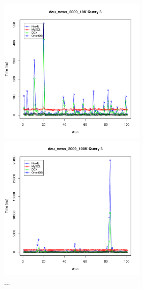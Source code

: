 \documentclass[11pt, a4paper, oneside]{article} %
\begin{document}
\begin{appendix}
\begin{figure}[ht]
\begin{minipage}[hbt]{7cm}
	\centering
	\includegraphics[width=7cm]{../results/cold caches/images/10K_query3_perf}
	\caption{...}
	\label{fig:10k_query3_perf}
\end{minipage}
\hfill
\begin{minipage}[hbt]{7cm}
	\centering
	\includegraphics[width=7cm]{../results/cold caches/images/100K_query3_perf}
	\caption{...}
	\label{fig:100k_query3_perf}
\end{minipage}
\end{figure}

\newpage
\thispagestyle{empty}


\end{appendix}
\end{document}
